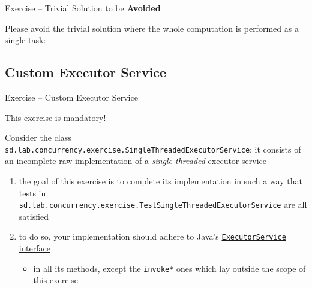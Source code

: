 \documentclass[presentation]{beamer}\mode<presentation>{\usetheme{AMSBolognaFC}}
\begin{document}
\begin{frame}[c,allowframebreaks]{Exercise \currentExercise{} -- Trivial Solution to be \textbf{Avoided}}

	Please \alert{avoid} the trivial solution where the whole computation is performed as a single task:
	

\end{frame}

\startExercise

\subsection{Custom Executor Service}

\begin{frame}[c,allowframebreaks]{Exercise \currentExercise{} -- Custom Executor Service}

    \begin{alertblock}{}
        \centering
        This exercise is \alert{mandatory}!
    \end{alertblock}

    \bigskip

	Consider the class \texttt{sd.lab.concurrency.exercise.\alert{SingleThreadedExecutorService}}: it consists of an \alert{incomplete} raw implementation of a \emph{single-threaded} executor service
	\begin{enumerate}
		\item the goal of this exercise is to complete its implementation in such a way that tests in \texttt{sd.lab\allowbreak{}.concurrency\allowbreak{}.exercise\allowbreak{}.\alert{TestSingleThreadedExecutorService}}
		are all satisfied

		\bigskip

		\item to do so, your implementation should adhere to Java's \href{https://docs.oracle.com/javase/8/docs/api/java/util/concurrent/ExecutorService.html}{\texttt{ExecutorService} interface}
		\begin{itemize}
			\item in all its methods, except the \texttt{invoke*} ones which lay outside the scope of this exercise
		\end{itemize}

		\bigskip


\end{enumerate}
\end{frame}
\end{document}

